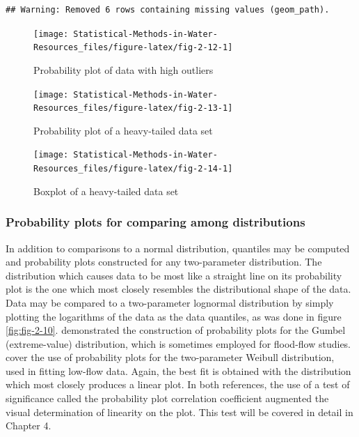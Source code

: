 \documentclass[]{book}
\begin{document}
\begin{verbatim}
## Warning: Removed 6 rows containing missing values (geom_path).
\end{verbatim}

\begin{figure}

{\centering \texttt{[image: Statistical-Methods-in-Water-Resources\_files/figure-latex/fig-2-12-1]} 

}

\caption{Probability plot of data with high outliers}\label{fig:fig-2-12}
\end{figure}
\begin{figure}

{\centering \texttt{[image: Statistical-Methods-in-Water-Resources\_files/figure-latex/fig-2-13-1]} 

}

\caption{Probability plot of a heavy-tailed data set}\label{fig:fig-2-13}
\end{figure}
\begin{figure}

{\centering \texttt{[image: Statistical-Methods-in-Water-Resources\_files/figure-latex/fig-2-14-1]} 

}

\caption{Boxplot of a heavy-tailed data set}\label{fig:fig-2-14}
\end{figure}

\hypertarget{probability-plots-for-comparing-among-distributions}{%
\subsubsection{Probability plots for comparing among distributions}\label{probability-plots-for-comparing-among-distributions}}

In addition to comparisons to a normal distribution, quantiles may be computed and probability plots constructed for any two-parameter distribution. The distribution which causes data to be most like a straight line on its probability plot is the one which most closely resembles the distributional shape of the data. Data may be compared to a two-parameter lognormal distribution by simply plotting the logarithms of the data as the data quantiles, as was done in figure \ref{fig:fig-2-10}. \citet{vogel_probability_1986} demonstrated the construction of probability plots for the Gumbel (extreme-value) distribution, which is sometimes employed for flood-flow studies. \citet{vogel_low_1989} cover the use of probability plots for the two-parameter Weibull distribution, used in fitting low-flow data. Again, the best fit is obtained with the distribution which most closely produces a linear plot. In both references, the use of a test of significance called the probability plot correlation coefficient augmented the visual determination of linearity on the plot. This test will be covered in detail in Chapter 4.
\end{document}
